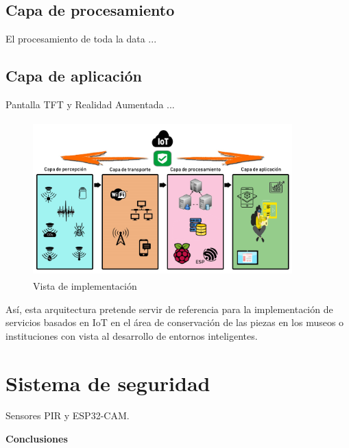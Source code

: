     \subsection{Capa de procesamiento}\label{subsec:capa_procesamiento}
    El procesamiento de toda la data ...
    
    \subsection{Capa de aplicación}\label{subsec:capa_aplicacion}
    Pantalla TFT y Realidad Aumentada ...\\

    \vspace{6cm}

    \begin{figure}[h]
        \centering
        \includegraphics[width=10cm, height=6cm]{imagenes/myArquitecture.jpg}
        \caption{Vista de implementación}
        \label{imag:descripcionArquitectura}
    \end{figure}

    Así, esta arquitectura pretende servir de referencia para la implementación de servicios basados en IoT en el área de conservación de las piezas en los museos o instituciones con vista al desarrollo de entornos inteligentes.\\



    \section{Sistema de seguridad}\label{sec: sistemaSeguridad}
    Sensores PIR y ESP32-CAM.\\

    \textbf{\Large Conclusiones}\newline